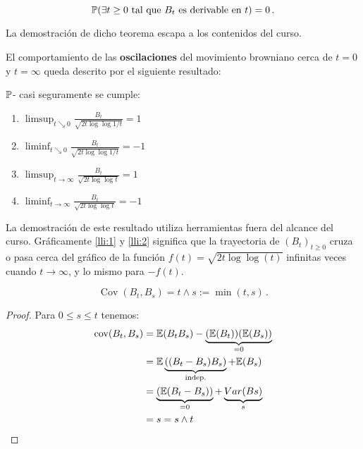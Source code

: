 \begin{theorem}
$$\P( \exists t \geq 0 \text{ tal que } B_t \text{ es derivable en } t) = 0 \,.$$
\end{theorem}

La demostración de dicho teorema escapa a los contenidos del curso. 

\newp El comportamiento de las \textbf{oscilaciones} del movimiento browniano cerca de $t=0$ y $t=\infty$ queda descrito por el siguiente resultado:

\begin{theorem}
$\P$- casi seguramente se cumple:
\begin{enumerate}
     \item \label{lli:1} $\limsup_{t \searrow 0} \frac{B_t}{\sqrt{ 2t \log \log {1/t}}} = 1$
     \item \label{lli:2} $\liminf_{t \searrow 0} \frac{B_t}{\sqrt{ 2t \log \log {1/t}}} = -1$
     \item \label{lli:3} $\limsup_{t \rightarrow \infty} \frac{B_t}{\sqrt{ 2t \log \log {t}}} = 1$
     \item \label{lli:4} $\liminf_{t \rightarrow \infty} \frac{B_t}{\sqrt{ 2t \log \log {t}}} = -1$
\end{enumerate}
\end{theorem}

\newp La demostración de este resultado utiliza herramientas fuera del alcance del curso. Gráficamente  \ref{lli:1} y \ref{lli:2} significa que la trayectoria de $(B_{t})_{t \geq 0}$ cruza o pasa cerca del gráfico de la función $f(t) = \sqrt{2t \log \log (t)} $ infinitas veces cuando $t \rightarrow \infty$, y lo mismo para $-f(t)$. 

\begin{proposition}
     $$\operatorname{Cov}(B_t,B_s) = t \wedge s := \min(t,s)\,.$$ 
\end{proposition}
\begin{proof}
\gris
 Para $0 \leq s \leq t$ tenemos: 
\begin{align*}
     \operatorname{cov}(B_t, B_s)
     &= \E (B_t B_s) - \underbrace{(\E (B_t))(\E (B_s))}_{= 0} \\
     &= \E \underbrace{((B_t - B_s)B_s)}_{\text{indep.}} + \E(B_s) \\
     &= \underbrace{\left( \E(B_t - B_s) \right)}_{=0} + \underbrace{\var({Bs})}_{s}\\
     &= s = s \wedge t
\end{align*}
\findem
\negro
\end{proof}

